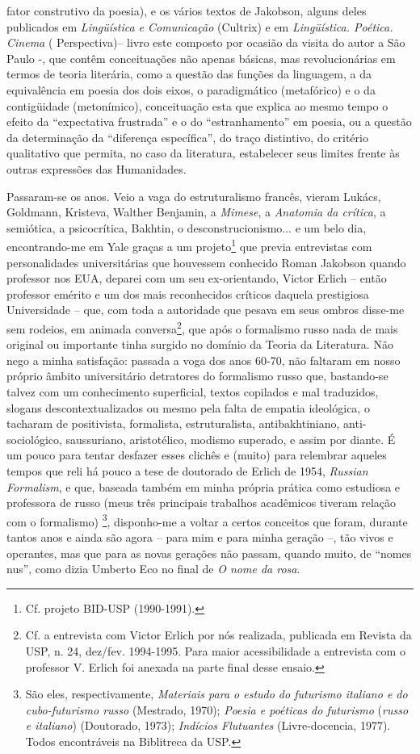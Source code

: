 fator construtivo da poesia), e os vários textos de Jakobson, alguns
deles publicados em \emph{Lingüística e Comunicação} (Cultrix) e em
\emph{Lingüística. Poética. Cinema} ( Perspectiva)-- livro este composto
por ocasião da visita do autor a São Paulo -, que contêm conceituações
não apenas básicas, mas revolucionárias em termos de teoria literária,
como a questão das funções da linguagem, a da equivalência em poesia dos
dois eixos, o paradigmático (metafórico) e o da contigüidade
(metonímico), conceituação esta que explica ao mesmo tempo o efeito da
``expectativa frustrada'' e o do ``estranhamento'' em poesia, ou a
questão da determinação da ``diferença específica'', do traço
distintivo, do critério qualitativo que permita, no caso da literatura,
estabelecer seus limites frente às outras expressões das Humanidades.

Passaram-se os anos. Veio a vaga do estruturalismo francês, vieram
Lukács, Goldmann, Kristeva, Walther Benjamin, a \emph{Mimese}, a
\emph{Anatomia da crítica}, a semiótica, a psicocrítica, Bakhtin, o
desconstrucionismo... e um belo dia, encontrando-me em Yale graças a um
projeto\footnote{Cf. projeto BID-USP (1990-1991).} que previa
entrevistas com personalidades universitárias que houvessem conhecido
Roman Jakobson quando professor nos EUA, deparei com um seu
ex-orientando, Victor Erlich -- então professor emérito e um dos mais
reconhecidos críticos daquela prestigiosa Universidade -- que, com toda
a autoridade que pesava em seus ombros disse-me sem rodeios, em animada
conversa\footnote{Cf. a entrevista com Victor Erlich por nós realizada,
  publicada em Revista da USP, n. 24, dez/fev. 1994-1995. Para maior
  acessibilidade a entrevista com o professor V. Erlich foi anexada na
  parte final desse ensaio.}, que após o formalismo russo nada de mais
original ou importante tinha surgido no domínio da Teoria da Literatura.
Não nego a minha satisfação: passada a voga dos anos 60-70, não faltaram
em nosso próprio âmbito universitário detratores do formalismo russo
que, bastando-se talvez com um conhecimento superficial, textos
copilados e mal traduzidos, slogans descontextualizados ou mesmo pela
falta de empatia ideológica, o tacharam de positivista, formalista,
estruturalista, antibakhtiniano, anti-sociológico, saussuriano,
aristotélico, modismo superado, e assim por diante. É um pouco para
tentar desfazer esses clichês e (muito) para relembrar aqueles tempos
que reli há pouco a tese de doutorado de Erlich de 1954, \emph{Russian
Formalism}, e que, baseada também em minha própria prática como
estudiosa e professora de russo (meus três principais trabalhos
acadêmicos tiveram relação com o formalismo) \footnote{São eles,
  respectivamente, \emph{Materiais para o estudo do futurismo italiano e
  do cubo-futurismo russo} (Mestrado, 1970); \emph{Poesia e poéticas do
  futurismo} (\emph{russo e italiano}) (Doutorado, 1973); \emph{Indícios
  Flutuantes} (Livre-docencia, 1977). Todos encontráveis na Biblitreca
  da USP.}, disponho-me a voltar a certos conceitos que foram, durante
tantos anos e ainda são agora -- para mim e para minha geração --, tão
vivos e operantes, mas que para as novas gerações não passam, quando
muito, de ``nomes nus'', como dizia Umberto Eco no final de \emph{O nome
da rosa}.

